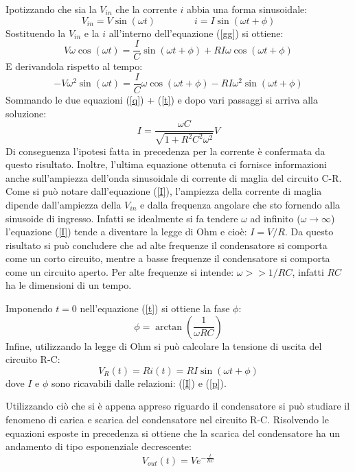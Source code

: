 \documentclass[11pt]{article}
\begin{document}
Ipotizzando che sia la $V_{in}$ che la corrente $i$ abbia una forma sinusoidale:
\begin{equation}
    V_{in}=V\sin(\omega t) \qquad \qquad i=I\sin(\omega t + \phi)
\end{equation}
Sostituendo la $V_{in}$ e la $i$ all'interno dell'equazione (\ref{gg}) si ottiene:
\begin{equation}
    V\omega\cos(\omega t)=\frac{I}{C}\sin(\omega t + \phi)+RI\omega\cos(\omega t+\phi)
    \label{q}
\end{equation}
E derivandola rispetto al tempo:
\begin{equation}
    -V\omega^2\sin(\omega t)=\frac{I}{C}\omega\cos(\omega t +\phi)-RI\omega^2\sin(\omega t+\phi)
    \label{t}
\end{equation}
Sommando le due equazioni (\ref{q}) + (\ref{t}) e dopo vari passaggi si arriva alla soluzione:
\begin{equation}
    I=\frac{\omega C}{\sqrt{1+R^2C^2\omega^2}}V
    \label{I}
\end{equation}
Di conseguenza l'ipotesi fatta in precedenza per la corrente è confermata da questo risultato. Inoltre, l'ultima equazione ottenuta ci fornisce informazioni anche sull'ampiezza dell'onda sinusoidale di corrente di maglia del circuito C-R. Come si può notare dall'equazione (\ref{I}), l'ampiezza della corrente di maglia dipende dall'ampiezza della $V_{in}$ e dalla frequenza angolare che sto fornendo alla sinusoide di ingresso. Infatti se idealmente si fa tendere $\omega$ ad infinito ($\omega \to \infty$) l'equazione (\ref{I}) tende a diventare la legge di Ohm e cioè: $I=V/R$. Da questo risultato si può concludere che ad alte frequenze il condensatore si comporta come un corto circuito, mentre a basse frequenze il condensatore si comporta come un circuito aperto. Per alte frequenze si intende: $\omega >> 1/RC$, infatti $RC$ ha le dimensioni di un tempo.

Imponendo $t=0$ nell'equazione (\ref{t}) si ottiene la fase $\phi$:
\begin{equation}
    \phi=\arctan\left(\frac{1}{\omega RC}\right)
    \label{p}
\end{equation}
Infine, utilizzando la legge di Ohm si può calcolare la tensione di uscita del circuito R-C:
\begin{equation}
    V_R(t)=Ri(t)=RI\sin(\omega t+\phi)
\end{equation}
dove $I$ e $\phi$ sono ricavabili dalle relazioni: (\ref{I}) e (\ref{p}). 

Utilizzando ciò che si è appena appreso riguardo il condensatore si può studiare il fenomeno di carica e scarica del condensatore nel circuito R-C. Risolvendo le equazioni esposte in precedenza si ottiene che la scarica del condensatore ha un andamento di tipo esponenziale decrescente:
\begin{equation}
    V_{out}(t)=Ve^{-\frac{t}{RC}}
\end{equation}
\end{document}
